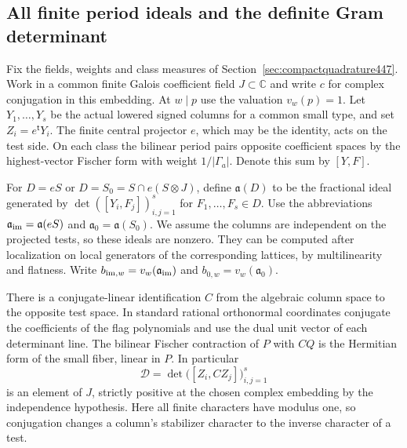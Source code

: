 \documentclass[a4paper,11pt]{article}
\theoremstyle{definition}
\theoremstyle{remark}
\numberwithin{equation}{section}
\begin{document}
\subsection{All finite period ideals and the definite Gram determinant}
\label{sec:globalperiodcontent448}

Fix the fields, weights and class measures of
Section~\ref{sec:compactquadrature447}. Work in a common finite
Galois coefficient field \(J\subset\mathbb C\) and write \(c\) for
complex conjugation in this embedding. At \(w\mid p\) use the
valuation \(v_w(p)=1\). Let \(Y_1,\ldots,Y_s\) be the actual lowered
signed columns for a common small type, and set \(Z_i=e^{\mathsf t}Y_i\).
The finite central projector \(e\), which may be the identity, acts
on the test side. On each class the bilinear period pairs opposite
coefficient spaces by the highest-vector Fischer form with weight
\(1/|\Gamma_a|\). Denote this sum by \([Y,F]\).

For \(D=eS\) or \(D=S_0=S\cap e(S\otimes J)\), define
\(\mathfrak a(D)\) to be the fractional ideal generated by
\(\det([Y_i,F_j])_{i,j=1}^s\) for \(F_1,\ldots,F_s\in D\).
Use the abbreviations \(\mathfrak a_{\rm im}=\mathfrak a(eS)\) and
\(\mathfrak a_0=\mathfrak a(S_0)\). We assume the columns are
independent on the projected tests, so these ideals are nonzero.
They can be computed after localization on local generators of the
corresponding lattices, by multilinearity and flatness. Write
\(b_{{\rm im},w}=v_w(\mathfrak a_{\rm im})\) and
\(b_{0,w}=v_w(\mathfrak a_0)\).

There is a conjugate-linear identification \(C\) from the algebraic
column space to the opposite test space. In standard rational
orthonormal coordinates conjugate the coefficients of the flag
polynomials and use the dual unit vector of each determinant line.
The bilinear Fischer contraction of \(P\) with \(CQ\) is the
Hermitian form of the small fiber, linear in \(P\). In particular
\[
             \mathcal D=\det\big([Z_i,CZ_j]\big)_{i,j=1}^s
\]
is an element of \(J\), strictly positive at the chosen complex
embedding by the independence hypothesis. Here all finite
characters have modulus one, so conjugation changes a column's
stabilizer character to the inverse character of a test.
\end{document}
